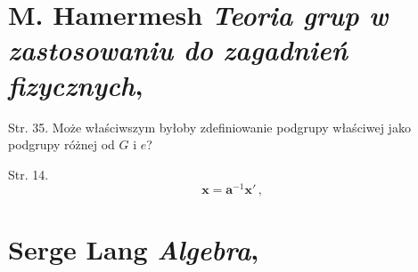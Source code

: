 \documentclass[a4paper,11pt]{article}
\numberwithin{equation}{section}
\begin{document}










\newpage

\section{M. Hamermesh \textit{Teoria grup w zastosowaniu do zagadnień fizycznych}, \cite{}}



Str. 35. Może właściwszym byłoby zdefiniowanie podgrupy
  właściwej jako podgrupy różnej od $G$ i $e$?

Str. 14.
$$ \mathbf{ x } = \mathbf{ a }^{ -1 } \mathbf{ x }' \, ,$$


\VerSpaceTwo












\section{Serge Lang \textit{Algebra},
  \parencite{Lang-Algebra-Pub-1984}}

\label{sec:Lang-Algebra}




\vspace{0em}


\noindent

\end{document}

